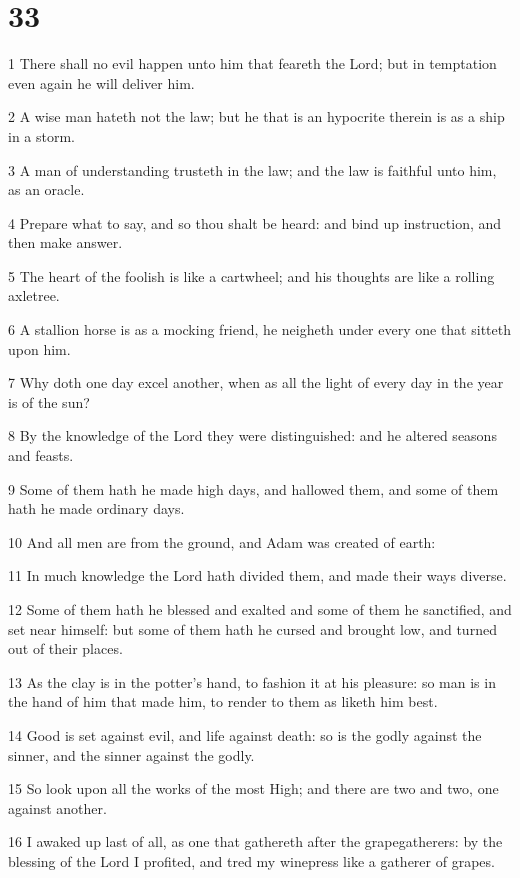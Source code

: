 \chapter{33}

\par 1 There shall no evil happen unto him that feareth the Lord; but in temptation even again he will deliver him.
\par 2 A wise man hateth not the law; but he that is an hypocrite therein is as a ship in a storm.
\par 3 A man of understanding trusteth in the law; and the law is faithful unto him, as an oracle.
\par 4 Prepare what to say, and so thou shalt be heard: and bind up instruction, and then make answer.
\par 5 The heart of the foolish is like a cartwheel; and his thoughts are like a rolling axletree.
\par 6 A stallion horse is as a mocking friend, he neigheth under every one that sitteth upon him.
\par 7 Why doth one day excel another, when as all the light of every day in the year is of the sun?
\par 8 By the knowledge of the Lord they were distinguished: and he altered seasons and feasts.
\par 9 Some of them hath he made high days, and hallowed them, and some of them hath he made ordinary days.
\par 10 And all men are from the ground, and Adam was created of earth:
\par 11 In much knowledge the Lord hath divided them, and made their ways diverse.
\par 12 Some of them hath he blessed and exalted and some of them he sanctified, and set near himself: but some of them hath he cursed and brought low, and turned out of their places.
\par 13 As the clay is in the potter's hand, to fashion it at his pleasure: so man is in the hand of him that made him, to render to them as liketh him best.
\par 14 Good is set against evil, and life against death: so is the godly against the sinner, and the sinner against the godly.
\par 15 So look upon all the works of the most High; and there are two and two, one against another.
\par 16 I awaked up last of all, as one that gathereth after the grapegatherers: by the blessing of the Lord I profited, and tred my winepress like a gatherer of grapes.
